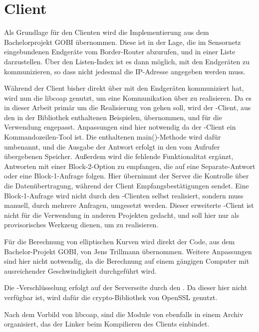 \section{Client}

Als Grundlage für den Clienten wird die Implementierung aus dem Bachelorprojekt GOBI übernommen. Diese ist in der Lage, die im Sensornetz eingebundenen
Endgeräte vom Border-Router abzurufen, und in einer Liste darzustellen. Über den Listen-Index ist es dann möglich, mit den Endgeräten zu kommunizieren,
so dass nicht jedesmal die IP-Adresse angegeben werden muss.

Während der Client bisher direkt über  mit den Endgeräten kommuniziert hat, wird nun die libcoap \cite{libcoap} genutzt, um eine Kommunikation
über  zu realisieren. Da es in dieser Arbeit primär um die Realisierung von  gehen soll, wird der -Client, aus den in der
Bibliothek enthaltenen Beispielen, übernommen, und für die Verwendung engepasst. Anpassungen sind hier notwendig da der -Client ein
Kommandozeilen-Tool ist. Die enthaltenen main()-Methode wird dafür umbenannt, und die Ausgabe der Antwort erfolgt in den vom Aufrufer übergebenen Speicher.
Außerdem wird die fehlende Funktionalitat ergänzt, Antworten mit einer Block-2-Option zu empfangen, die auf eine Separate-Antwort oder eine Block-1-Anfrage
folgen. Hier übernimmt der Server die Kontrolle über die Datenübertragung, während der Client Empfangsbestätigungen sendet. Eine Block-1-Anfrage wird
nicht durch den -Clienten selbst realisiert, sondern muss manuell, durch mehrere Anfragen, umgesetzt werden. Dieser erweiterte -Client
ist nicht für die Verwendung in anderen Projekten gedacht, und soll hier nur als provisorisches Werkzeug dienen, um  zu realisieren.

Für die Berechnung von elliptischen Kurven wird direkt der Code, aus dem Bachelor-Projekt GOBI, von Jens Trillmann übernommen. Weitere Anpassungen
sind hier nicht notwendig, da die Berechnung auf einem gängigen Computer mit ausreichender Geschwindigkeit durchgeführt wird.

Die -Verschlüsselung erfolgt auf der Serverseite durch den . Da dieser hier nicht verfügbar ist, wird dafür die
crypto-Bibliothek von OpenSSL \cite{openssl} genutzt. 

Nach dem Vorbild von libcoap, sind die Module von  ebenfalls in einem Archiv organisiert, das der Linker beim Kompilieren des Clients einbindet.

